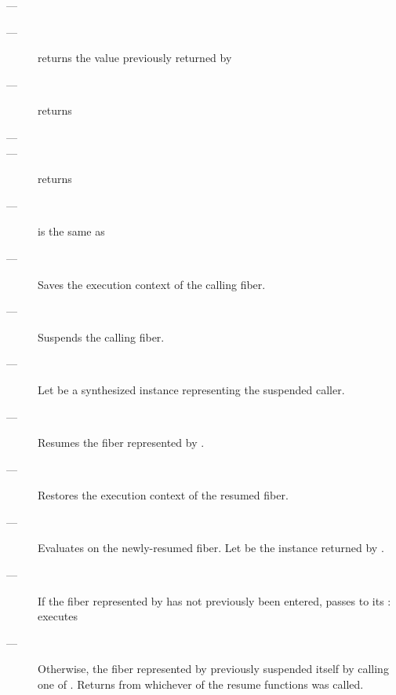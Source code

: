 \returns
\begin{description}
    \item[---] 
\end{description}

\postcond
\begin{description}
    \item[---]  returns the value previously returned by 
    \item[---]  returns 
\end{description}


\mandates
\begin{description}
    \item[---] 
    \item[---]  returns 
    \item[---] \currthread is the same as \lastthread
\end{description}

\effects
\begin{description}
    \item[---] Saves the execution context of the calling fiber.
    \item[---] Suspends the calling fiber.
    \item[---] Let  be a synthesized \fiber instance representing
               the suspended caller.
    \item[---] Resumes the fiber represented by .
    \item[---] Restores the execution context of the resumed fiber.
    \item[---] Evaluates 
               on the newly-resumed fiber.
               Let  be the \fiber instance returned by .
    \item[---] If the fiber represented by  has not previously been
               entered, passes  to its \entryfn: executes\\
    \item[---] Otherwise, the fiber represented by  previously
               suspended itself by calling one of \anyresume.
               Returns  from whichever of the resume functions
               was called.
\end{description}


